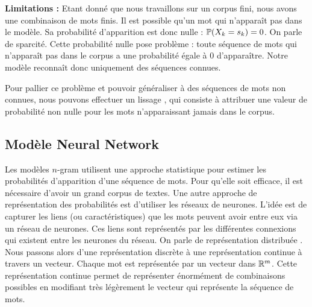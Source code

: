 \textbf{Limitations :} Etant donné que nous travaillons sur un corpus fini, nous avons une combinaison de mots finis. Il est possible qu'un mot qui n'apparaît pas dans le modèle. Sa probabilité d'apparition est donc nulle : $\P(X_k = s_k) = 0$. On parle de sparcité. Cette probabilité nulle pose problème : toute séquence de mots qui n'apparaît pas dans le corpus a une probabilité égale à 0 d'apparaître.
Notre modèle reconnaît donc uniquement des séquences connues.

Pour pallier ce problème et pouvoir généraliser à des séquences de mots non connues, nous pouvons effectuer un \og lissage \fg{}, qui consiste à attribuer une valeur de probabilité non nulle pour les mots n'apparaissant jamais dans le corpus.

\subsection{Modèle Neural Network}

Les modèles $n$-gram utilisent une approche statistique pour estimer les probabilités d'apparition d'une séquence de mots. Pour qu'elle soit efficace, il est nécessaire d'avoir un grand corpus de textes.
Une autre approche de représentation des probabilités est d'utiliser les réseaux de neurones.
L'idée est de capturer les liens (ou caractéristiques) que les mots peuvent avoir entre eux via un réseau de neurones. Ces liens sont représentés par les différentes connexions qui existent entre les neurones du réseau.
On parle de \og représentation distribuée \fg{}.
Nous passons alors d'une représentation discrète à une représentation continue à travers un vecteur. 
Chaque mot est représentée par un vecteur dans $\R^m$. Cette représentation continue permet de représenter énormément de combinaisons possibles en modifiant très légèrement le vecteur qui représente la séquence de mots.



